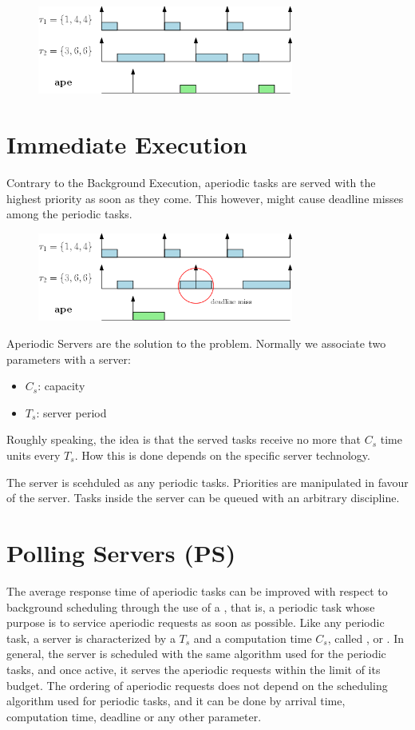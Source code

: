     \begin{figure}[!h]
        \centering
        \includegraphics[width = 0.75\textwidth]{images/image02.png}
    \end{figure}

\section{Immediate Execution}
Contrary to the Background Execution, aperiodic tasks are served with the highest priority as soon as they come. This however, might cause deadline misses among the periodic tasks.

\begin{figure}[!h]
    \centering
    \includegraphics[width = 0.75\textwidth]{images/image03.png}
\end{figure}

Aperiodic Servers are the solution to the problem. Normally we associate two parameters with a server:
\begin{itemize}
    \item $C_s$: capacity
    \item $T_s$: server period
\end{itemize}
Roughly speaking, the idea is that the served tasks receive no more that $C_s$ time units every $T_s$. How this is done depends on the specific server technology.


The server is scehduled as any periodic tasks. Priorities are manipulated in favour of the server. Tasks inside the server can be queued with an arbitrary discipline.
\section{Polling Servers (PS)}
The average response time of aperiodic tasks can be improved with respect to background scheduling through the use of a , that is, a periodic task whose purpose is to service aperiodic requests as soon as possible. Like any periodic task, a server is characterized by a  $T_s$ and a computation time $C_s$, called , or . In general, the server is scheduled with the same algorithm used for the periodic tasks, and once active, it serves the aperiodic requests within the limit of its budget. The ordering of aperiodic requests does not depend on the scheduling algorithm used for periodic tasks, and it can be done by arrival time, computation time, deadline or any other parameter.


